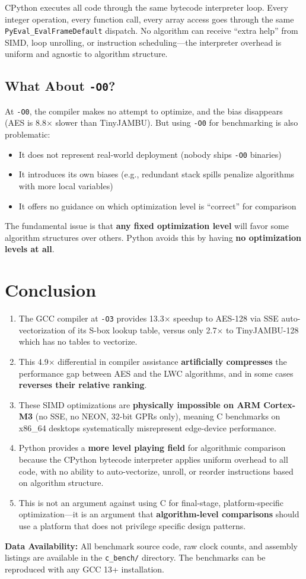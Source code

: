 \documentclass[11pt,a4paper]{article}
\begin{document}
CPython executes all code through the same bytecode interpreter loop. Every integer operation, every function call, every array access goes through the same {\tt PyEval\_EvalFrameDefault} dispatch. No algorithm can receive ``extra help'' from SIMD, loop unrolling, or instruction scheduling---the interpreter overhead is uniform and agnostic to algorithm structure.

\subsection{What About {\tt -O0}?}

At {\tt -O0}, the compiler makes no attempt to optimize, and the bias disappears (AES is 8.8$\times$ slower than TinyJAMBU). But using {\tt -O0} for benchmarking is also problematic:
\begin{itemize}
    \item It does not represent real-world deployment (nobody ships {\tt -O0} binaries)
    \item It introduces its own biases (e.g., redundant stack spills penalize algorithms with more local variables)
    \item It offers no guidance on which optimization level is ``correct'' for comparison
\end{itemize}

The fundamental issue is that \textbf{any fixed optimization level} will favor some algorithm structures over others. Python avoids this by having \textbf{no optimization levels at all}.

\section{Conclusion}

\begin{enumerate}
    \item The GCC compiler at {\tt -O3} provides 13.3$\times$ speedup to AES-128 via SSE auto-vectorization of its S-box lookup table, versus only 2.7$\times$ to TinyJAMBU-128 which has no tables to vectorize.
    \item This 4.9$\times$ differential in compiler assistance {\bf artificially compresses} the performance gap between AES and the LWC algorithms, and in some cases \textbf{reverses their relative ranking}.
    \item These SIMD optimizations are \textbf{physically impossible on ARM Cortex-M3} (no SSE, no NEON, 32-bit GPRs only), meaning C benchmarks on x86\_64 desktops systematically misrepresent edge-device performance.
    \item Python provides a \textbf{more level playing field} for algorithmic comparison because the CPython bytecode interpreter applies uniform overhead to all code, with no ability to auto-vectorize, unroll, or reorder instructions based on algorithm structure.
    \item This is not an argument against using C for final-stage, platform-specific optimization---it is an argument that \textbf{algorithm-level comparisons} should use a platform that does not privilege specific design patterns.
\end{enumerate}

\vspace{12pt}
\noindent\textbf{Data Availability:} All benchmark source code, raw clock counts, and assembly listings are available in the {\tt c\_bench/} directory. The benchmarks can be reproduced with any GCC 13+ installation.
\end{document}
